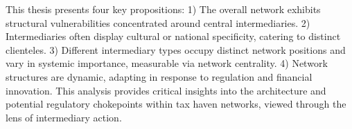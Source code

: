 \documentclass[12pt, a4paper]{report}
\begin{document}
   This thesis presents four key propositions: 1) The overall network exhibits structural vulnerabilities concentrated around central intermediaries. 2) Intermediaries often display cultural or national specificity, catering to distinct clienteles. 3) Different intermediary types occupy distinct network positions and vary in systemic importance, measurable via network centrality. 4) Network structures are dynamic, adapting in response to regulation and financial innovation. This analysis provides critical insights into the architecture and potential regulatory chokepoints within tax haven networks, viewed through the lens of intermediary action. 

\pagestyle{fancy} %








\appendix



\printbibliography


\end{document}

